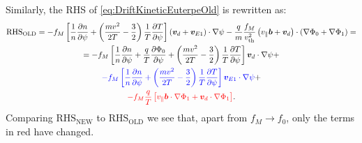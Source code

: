 \documentclass[12pt]{article}
\newcommand{\p}{\partial}
\newcommand{\na}{\nabla}
\begin{document}
Similarly, the RHS of \ref{eq:DriftKineticEuterpeOld} is rewritten as:
\begin{multline}
{\mathrm{RHS}}_{\mathrm{OLD}} =
- f_M \left[\frac{1}{n} \frac{\p n}{\p \psi} + \left(\frac{m v^2}{2 T} - \frac{3}{2}\right) \frac{1}{T} \frac{\p T}{\p \psi}\right] 
\left(\bm{v}_d + \bm{v}_{E1}\right) \cdot \na \psi - 
\frac{q}{m} \frac{f_M}{v_{\mathrm{th}}^2} \left(v_\| \bm{b} + \bm{v}_d\right) \cdot \left(\na \Phi_0 + \na \Phi_1\right) = \\ =
- f_M \left[\frac{1}{n} \frac{\p n}{\p \psi} + \frac{q}{T} \frac{\p \Phi_0}{\p \psi} + \left(\frac{m v^2}{2 T} - \frac{3}{2}\right) \frac{1}{T} \frac{\p T}{\p \psi}\right] 
\bm{v}_d \cdot \na \psi + \\  
\textcolor{blue}{- f_M \left[\frac{1}{n} \frac{\p n}{\p \psi} + \left(\frac{m v^2}{2 T} - \frac{3}{2}\right) \frac{1}{T} \frac{\p T}{\p \psi}\right] 
\bm{v}_{E1} \cdot \na \psi}  + \\  
\textcolor{red}{- f_M \frac{q}{T} \left[v_\| \bm{b} \cdot  \na \Phi_1 + \bm{v}_d \cdot  \na \Phi_1\right]}.
\label{eq:DriftKineticEuterpeOldRHS}
\end{multline}
Comparing ${\mathrm{RHS}}_{\mathrm{NEW}}$ to ${\mathrm{RHS}}_{\mathrm{OLD}}$ we see that, apart from $f_M \rightarrow f_0$, only the terms in red have changed. 
\end{document}
